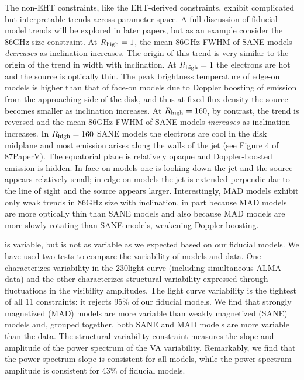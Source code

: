 The non-EHT constraints, like the EHT-derived constraints, exhibit  complicated but interpretable trends across parameter space. A full discussion of fiducial model trends will be explored in later papers, but as an example consider the 86GHz size constraint.  At $R_\mathrm{high} = 1$, the mean 86GHz FWHM of SANE models {\em decreases} as inclination increases.  The origin of this trend is very similar to the origin of the trend in \mring width with inclination.  At $R_\mathrm{high} = 1$ the electrons are hot and the source is optically thin. The peak brightness temperature of edge-on models is higher than that of face-on models due to Doppler boosting of emission from the approaching side of the disk, and thus at fixed flux density the source becomes smaller as inclination increases.  At $R_\mathrm{high} = 160$, by contrast, the trend is reversed and the mean 86GHz FWHM of SANE models {\em increases} as inclination increases.  In $R_\mathrm{high} = 160$ SANE models the electrons are cool in the disk midplane and most emission arises along the walls of the jet (see Figure 4 of \M87PaperV).  The equatorial plane is relatively opaque and Doppler-boosted emission is hidden. In face-on models one is looking down the jet and the source appears relatively small; in edge-on models the jet is extended perpendicular to the line of sight and the source appears larger.  Interestingly, MAD models exhibit only weak trends in 86GHz size with inclination, in part because MAD models are more optically thin than SANE models and also because MAD models are more slowly rotating than SANE models, weakening Doppler boosting.

\sgra is variable, but is not as variable as we expected based on our fiducial models.
We have used two tests to compare the variability of models and data.
One characterizes variability in the 230\GHz light curve (including simultaneous ALMA data) and the other characterizes structural variability expressed through fluctuations in the visibility amplitudes.
The light curve variability is the tightest of all 11 constraints: it rejects 95\% of our fiducial models.
We find that strongly magnetized (MAD) models are more variable than weakly magnetized (SANE) models and, grouped together, both SANE and MAD models are more variable than the data.
The structural variability constraint measures the slope and amplitude of the power spectrum of the VA variability.
Remarkably, we find that the power spectrum slope is consistent for all models, while the power spectrum amplitude is consistent for 43\% of fiducial models.


